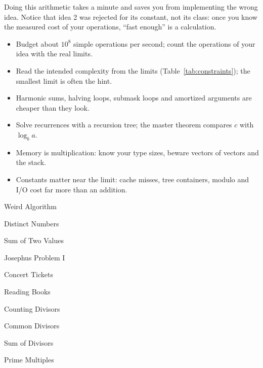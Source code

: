 Doing this arithmetic takes a minute and saves you from implementing the wrong idea. Notice that idea 2 was rejected for
its constant, not its class: once you know the measured cost of your operations, ``fast enough'' is a calculation.

\begin{summary}
\begin{itemize}
  \item Budget about $10^8$ simple operations per second; count the operations of your idea with the real limits.
  \item Read the intended complexity from the limits (Table~\ref{tab:constraints}); the smallest limit is often the hint.
  \item Harmonic sums, halving loops, submask loops and amortized arguments are cheaper than they look.
  \item Solve recurrences with a recursion tree; the master theorem compares $c$ with $\log_b a$.
  \item Memory is multiplication: know your type sizes, beware vectors of vectors and the stack.
  \item Constants matter near the limit: cache misses, tree containers, modulo and I/O cost far more than an addition.
\end{itemize}
\end{summary}

\begin{practice}
\begin{pplist}
  \item Weird Algorithm
  \item Distinct Numbers
  \item Sum of Two Values
  \item Josephus Problem I
  \item Concert Tickets
  \item Reading Books
\end{pplist}
\begin{pplist}
  \item Counting Divisors
  \item Common Divisors
  \item Sum of Divisors
  \item Prime Multiples
\end{pplist}
\end{practice}
